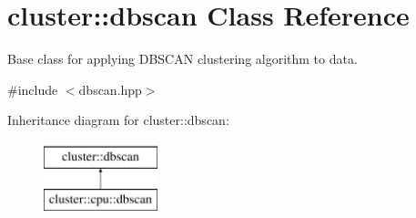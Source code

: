 \hypertarget{classcluster_1_1dbscan}{}\section{cluster\+:\+:dbscan Class Reference}
\label{classcluster_1_1dbscan}


Base class for applying D\+B\+S\+C\+A\+N clustering algorithm to data.  




{\ttfamily \#include $<$dbscan.\+hpp$>$}

Inheritance diagram for cluster\+:\+:dbscan\+:\begin{figure}[H]
\begin{center}
\leavevmode
\includegraphics[height=2.000000cm]{classcluster_1_1dbscan}
\end{center}
\end{figure}
